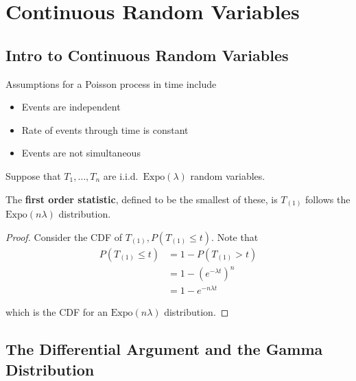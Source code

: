 \newpage

\section{Continuous Random Variables}

\subsection{Intro to Continuous Random Variables}
Assumptions for a Poisson process in time include
\begin{itemize}
    \item Events are independent
    \item Rate of events through time is constant
    \item Events are not simultaneous
\end{itemize}

Suppose that $T_1, \dots, T_n$ are i.i.d.\ $\mathrm{Expo}(\lambda)$ random variables. \\

\begin{definition}
The \textbf{first order statistic}, defined to be the smallest of these, is 
$T_{(1)}$ follows the $\mathrm{Expo}(n \lambda)$ distribution.
\end{definition}

\begin{proof}
Consider the CDF of $T_{(1)}, P(T_{(1)} \leq t)$. Note that
\begin{align*}
    P(T_{(1)} \leq t) &= 1 - P(T_{(1)} > t) \\
    &= 1 - \left( e^{-\lambda t} \right)^n \\
    &= 1 - e^{-n\lambda t} 
\end{align*}

which is the CDF for an $\mathrm{Expo}(n \lambda)$ distribution.
\end{proof}


\subsection{The Differential Argument and the Gamma Distribution}


